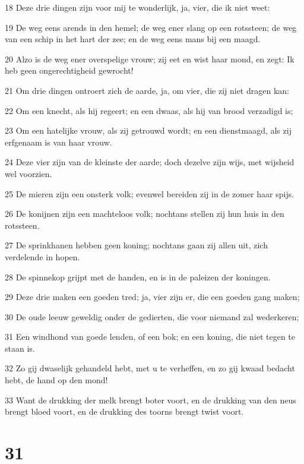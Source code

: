 \par 18 Deze drie dingen zijn voor mij te wonderlijk, ja, vier, die ik niet weet:
\par 19 De weg eens arends in den hemel; de weg ener slang op een rotssteen; de weg van een schip in het hart der zee; en de weg eens mans bij een maagd.
\par 20 Alzo is de weg ener overspelige vrouw; zij eet en wist haar mond, en zegt: Ik heb geen ongerechtigheid gewrocht!
\par 21 Om drie dingen ontroert zich de aarde, ja, om vier, die zij niet dragen kan:
\par 22 Om een knecht, als hij regeert; en een dwaas, als hij van brood verzadigd is;
\par 23 Om een hatelijke vrouw, als zij getrouwd wordt; en een dienstmaagd, als zij erfgenaam is van haar vrouw.
\par 24 Deze vier zijn van de kleinste der aarde; doch dezelve zijn wijs, met wijsheid wel voorzien.
\par 25 De mieren zijn een onsterk volk; evenwel bereiden zij in de zomer haar spijs.
\par 26 De konijnen zijn een machteloos volk; nochtans stellen zij hun huis in den rotssteen.
\par 27 De sprinkhanen hebben geen koning; nochtans gaan zij allen uit, zich verdelende in hopen.
\par 28 De spinnekop grijpt met de handen, en is in de paleizen der koningen.
\par 29 Deze drie maken een goeden tred; ja, vier zijn er, die een goeden gang maken;
\par 30 De oude leeuw geweldig onder de gedierten, die voor niemand zal wederkeren;
\par 31 Een windhond van goede lenden, of een bok; en een koning, die niet tegen te staan is.
\par 32 Zo gij dwaselijk gehandeld hebt, met u te verheffen, en zo gij kwaad bedacht hebt, de hand op den mond!
\par 33 Want de drukking der melk brengt boter voort, en de drukking van den neus brengt bloed voort, en de drukking des toorns brengt twist voort.

\chapter{31}

